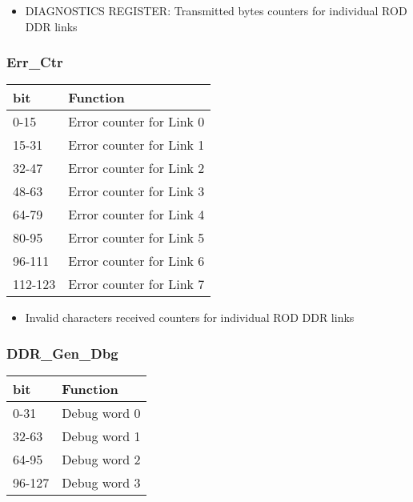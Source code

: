 \begin{itemize}
\item DIAGNOSTICS REGISTER: Transmitted bytes counters for individual ROD DDR links
\end{itemize}



\subsubsection{Err\_Ctr}

\begin {table}[H]
\begin{center}
\begin{tabular}{|l|l|}
\hline
\textbf{bit} & \textbf{Function} \\
\hline
0-15 & Error counter for Link 0 \\
\hline
15-31 & Error counter for Link 1 \\
\hline
32-47 & Error counter for Link 2 \\
\hline
48-63 & Error counter for Link 3 \\
\hline
64-79 & Error counter for Link 4 \\
\hline
80-95 & Error counter for Link 5 \\
\hline
96-111 & Error counter for Link 6 \\
\hline
112-123 & Error counter for Link 7 \\
\hline
\end{tabular}
\end{center}
\end{table}


\begin{itemize}
\item Invalid characters received counters for individual ROD DDR links
\end{itemize}



\subsubsection{DDR\_Gen\_Dbg}

\begin {table}[H]
\begin{center}
\begin{tabular}{|l|l|}
\hline
\textbf{bit} & \textbf{Function} \\
\hline
0-31 & Debug word 0 \\
\hline
32-63 & Debug word 1 \\
\hline
64-95 & Debug word 2 \\
\hline
96-127 & Debug word 3 \\
\hline
\end{tabular}
\end{center}
\end{table}


